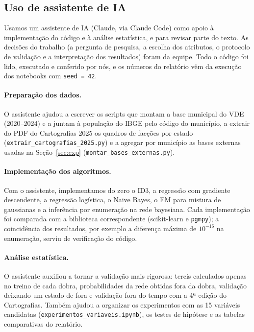 \documentclass[article,12pt,oneside,a4paper,brazil,sumario=tradicional]{abntex2}
\begin{document}
\begin{apendicesenv}

\section{Uso de assistente de IA}

Usamos um assistente de IA (Claude, via Claude Code) como apoio à implementação do código e
à análise estatística, e para revisar parte do texto. As decisões do trabalho (a pergunta de
pesquisa, a escolha dos atributos, o protocolo de validação e a interpretação dos
resultados) foram da equipe. Todo o código foi lido, executado e conferido por nós, e os
números do relatório vêm da execução dos notebooks com \texttt{seed = 42}.

\paragraph{Preparação dos dados.} O assistente ajudou a escrever os scripts que montam a base
municipal do VDE (2020--2024) e a juntam à população do IBGE pelo código do município, a
extrair do PDF do Cartografias 2025 os quadros de facções por estado
(\texttt{extrair\_cartografias\_2025.py}) e a agregar por município as bases externas usadas
na Seção~\ref{sec:exp} (\texttt{montar\_bases\_externas.py}).

\paragraph{Implementação dos algoritmos.} Com o assistente, implementamos do zero o ID3, a
regressão com gradiente descendente, a regressão logística, o Naive Bayes, o EM para mistura
de gaussianas e a inferência por enumeração na rede bayesiana. Cada implementação foi
comparada com a biblioteca correspondente (scikit-learn e \texttt{pgmpy}); a coincidência
dos resultados, por exemplo a diferença máxima de $10^{-16}$ na enumeração, serviu de
verificação do código.

\paragraph{Análise estatística.} O assistente auxiliou a tornar a validação mais rigorosa:
tercis calculados apenas no treino de cada dobra, probabilidades da rede obtidas fora da
dobra, validação deixando um estado de fora e validação fora do tempo com a 4ª edição do
Cartografias. Também ajudou a organizar os experimentos com as 15 variáveis candidatas
(\texttt{experimentos\_variaveis.ipynb}), os testes de hipótese e as tabelas comparativas do
relatório.


\end{apendicesenv}
\end{document}
